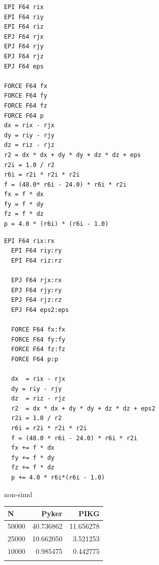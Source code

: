 \documentclass[ams, a4j]{U-AizuGT}
\begin{document}
\begin{lstlisting}[frame=single, caption=LennardJones-kernel.pyker, label=LennardJones-kernel.pyker]
EPI F64 rix
EPI F64 riy
EPI F64 riz
EPJ F64 rjx
EPJ F64 rjy
EPJ F64 rjz
EPJ F64 eps

FORCE F64 fx
FORCE F64 fy
FORCE F64 fz
FORCE F64 p
dx = rix - rjx
dy = riy - rjy
dz = riz - rjz
r2 = dx * dx + dy * dy + dz * dz + eps
r2i = 1.0 / r2
r6i = r2i * r2i * r2i
f = (48.0* r6i - 24.0) * r6i * r2i
fx = f * dx
fy = f * dy
fz = f * dz
p = 4.0 * (r6i) * (r6i - 1.0)
\end{lstlisting}
\begin{lstlisting}[frame=single, caption=LennardJones-kernel.pyker, label=LennardJones-kernel.pyker]
  EPI F64 rix:rx
  EPI F64 riy:ry
  EPI F64 riz:rz
  
  EPJ F64 rjx:rx
  EPJ F64 rjy:ry
  EPJ F64 rjz:rz
  EPJ F64 eps2:eps
  
  FORCE F64 fx:fx
  FORCE F64 fy:fy
  FORCE F64 fz:fz
  FORCE F64 p:p
  
  dx  = rix - rjx
  dy = riy - rjy
  dz  = riz - rjz
  r2  = dx * dx + dy * dy + dz * dz + eps2
  r2i = 1.0 / r2
  r6i = r2i * r2i * r2i
  f = (48.0 * r6i - 24.0) * r6i * r2i
  fx += f * dx
  fy += f * dy
  fz += f * dz
  p += 4.0 * r6i*(r6i - 1.0)

\end{lstlisting}


non-simd
\begin{tabular}{|l|r|r|} \hline
  N & Pyker & PIKG \\ \hline
  50000 & 40.736862 & 11.656278 \\
  25000 & 10.662050 & 3.521253 \\
  10000 & 0.985475 & 0.442775 \\
 \\ \hline
\end{tabular}
\end{document}
